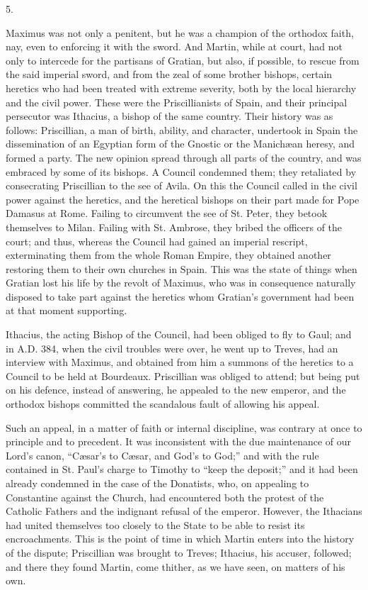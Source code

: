 5.

Maximus was not only a penitent, but he was a champion of the
orthodox faith, nay, even to enforcing it with the sword. And Martin,
while at court, had not only to intercede for the partisans of Gratian,
but also, if possible, to rescue from the said imperial sword, and
from the zeal of some brother bishops, certain heretics who had been
treated with extreme severity, both by the local hierarchy and the
civil power. These were the Priscillianists of Spain, and their
principal persecutor was Ithacius, a bishop of the same country. Their
history was as follows: Priscillian, a man of birth, ability, and
character, undertook in Spain the dissemination of an Egyptian form of
the Gnostic or the Manichæan heresy, and formed a party. The new
opinion spread through all parts of the country, and was embraced by
some of its bishops. A Council condemned them; they retaliated by
consecrating Priscillian to the see of Avila. On this the Council
called in the civil power against the heretics, and the heretical
bishops on their part made for Pope Damasus at Rome. Failing to
circumvent the see of St. Peter, they betook themselves to Milan.
Failing with St. Ambrose, they bribed the officers of the court; and
thus, whereas the Council had gained an imperial rescript,
exterminating them from the whole Roman Empire, they obtained another
restoring them to their own churches in Spain. This was the state of
things when Gratian lost his life by the revolt of Maximus, who was in
consequence naturally disposed to take part against the heretics whom
Gratian's government had been at that moment supporting.

Ithacius, the acting Bishop of the Council, had been obliged to fly
to Gaul; and in A.D. 384, when the civil
troubles were over, he went up to Treves, had an interview with
Maximus, and obtained from him a summons of the heretics to a Council
to be held at Bourdeaux. Priscillian was obliged to attend; but being
put on his defence, instead of answering, he appealed to the new
emperor, and the orthodox bishops committed the scandalous fault of
allowing his appeal.

Such an appeal, in a matter of faith or internal discipline, was
contrary at once to principle and to precedent. It was inconsistent
with the due maintenance of our Lord's canon, ``Cæsar's to Cæsar,
and God's to God;'' and with the rule contained in St. Paul's
charge to Timothy to ``keep the deposit;'' and it had been
already condemned in the case of the Donatists, who, on appealing to
Constantine against the Church, had encountered both the protest of
the Catholic Fathers and the indignant refusal of the emperor.
However, the Ithacians had united themselves too closely to the State
to be able to resist its encroachments. This is the point of time in
which Martin enters into the history of the dispute; Priscillian was
brought to Treves; Ithacius, his accuser, followed; and there they
found Martin, come thither, as we have seen, on matters of his own.

